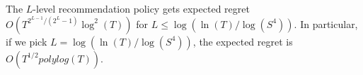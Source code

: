 \begin{comment}
   
   \draw[dashed] (0+0.4,6)--(6.4,7.5);  	
   \draw[dashed] (3+0.4,6)--(6.4,7.5);  	
  \node at (6,1.5)[rotate = 90]{$\cdots$};
  \node at (-1,1.5)[rotate = 90]{$\cdots$};
  \node at (6,9.5)[rotate = 90]{$\cdots$};
  \node at (-1,9.5)[rotate = 90]{$\cdots$};
  \node at(-1.2,0.5){\textbf{Level 1}};
  \node at(-1.2,3){\textbf{Level $l-2$}};
  \node at(-1.2,5.5){\textbf{Level $l-1$}};
  \node at(-1.2,8){\textbf{Level $l$}};
  \node at(-1.2,10.5){\textbf{Level $L$}};
  \draw[->] (13.3,0)--(13.3,12);
  \node at(13.7,6)[ rotate=90]{Time};
  \draw [rounded corners=5mm, line width=1mm, red](-0.2,1.75)--(12,1.75)--(12,9)--(-0.2,9)--cycle;\draw [rounded corners=2.5mm, line width=0.5mm, brown](5.9,6.5)--(8.9,6.5)--(8.9,8.8)--(5.9,8.8)--cycle;
\end{tikzpicture}
\caption{$l$-level Recommendation Policy.}
\label{fig:llevel}
\end{figure}
\end{comment}

\begin{theorem}
\label{thm:llevel}
The $L$-level recommendation policy gets expected regret $O\left(T^{2^{L-1}/(2^L-1)} \log^2(T) \right)$ for $L \leq \log(\ln(T)/\log(S^4))$. In particular, if we pick $L = \log(\ln(T)/\log(S^4))$, the expected regret is $O(T^{1/2} polylog(T))$. 
\end{theorem}

